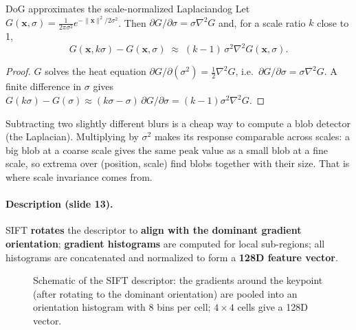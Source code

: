 \documentclass[11pt,a4paper]{article}
\newcommand{\norm}[1]{\lVert #1\rVert}
\begin{document}
\begin{proposition}{DoG approximates the scale-normalized Laplacian}{dog}
Let $G(\bm x,\sigma)=\frac1{2\pi\sigma^2}e^{-\norm{\bm x}^2/2\sigma^2}$. Then $\partial G/\partial\sigma=\sigma\nabla^2G$ and,
for a scale ratio $k$ close to 1,
\[
G(\bm x,k\sigma)-G(\bm x,\sigma)\;\approx\;(k-1)\,\sigma^2\nabla^2G(\bm x,\sigma).
\]
\end{proposition}
\begin{proof}
$G$ solves the heat equation $\partial G/\partial(\sigma^2)=\tfrac12\nabla^2G$, i.e.\ $\partial G/\partial\sigma=\sigma\nabla^2G$.
A finite difference in $\sigma$ gives $G(k\sigma)-G(\sigma)\approx(k\sigma-\sigma)\,\partial G/\partial\sigma=(k-1)\sigma^2\nabla^2G$.
\end{proof}

\begin{intuition}
Subtracting two slightly different blurs is a cheap way to compute a blob detector (the Laplacian). Multiplying by $\sigma^2$ makes
its response comparable across scales: a big blob at a coarse scale gives the same peak value as a small blob at a fine
scale, so extrema over (position, scale) find blobs together with their size. That is where scale invariance comes from.
\end{intuition}

\paragraph{Description (slide 13).}
SIFT \textbf{rotates} the descriptor to \textbf{align with the dominant gradient orientation}; \textbf{gradient histograms} are computed
for local sub-regions; all histograms are concatenated and normalized to form a \textbf{128D feature vector}.

\begin{figure}[H]
\centering
{}
\caption{Schematic of the SIFT descriptor: the gradients around the keypoint (after rotating to the dominant orientation) are
pooled into an orientation histogram with 8 bins per cell; $4\times4$ cells give a 128D vector.}
\end{figure}
\end{document}
